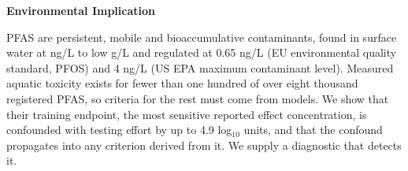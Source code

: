 \documentclass[11pt]{article}
\begin{document}
\noindent\textbf{Environmental Implication}

\medskip
\noindent
PFAS are persistent, mobile and bioaccumulative contaminants, found in surface
water at ng/L to low \textmu g/L and regulated at 0.65 ng/L (EU environmental
quality standard, PFOS) and 4 ng/L (US EPA maximum contaminant level). Measured
aquatic toxicity exists for fewer than one hundred of over eight thousand
registered PFAS, so criteria for the rest must come from models. We show that
their training endpoint, the most sensitive reported effect concentration, is
confounded with testing effort by up to 4.9 log$_{10}$ units, and that the
confound propagates into any criterion derived from it. We supply a diagnostic
that detects it.
\end{document}
